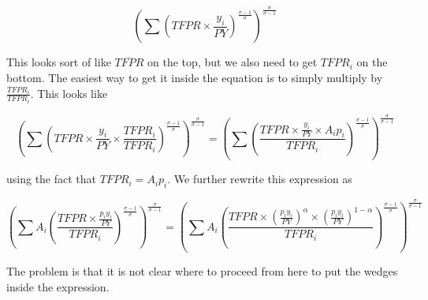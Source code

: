 \documentclass[12pt, letterpaper]{article}
\begin{document}
    \[ \left( \sum \left(TFPR \times \frac{y_i}{P Y}\right)^{\frac{\sigma - 1}{\sigma}} \right)^{\frac{\sigma}{\sigma - 1}}   \]

    This looks sort of like \(\overline{TFPR}\) on the top, but we also need to get \(TFPR_i\) on the bottom. The easiest way to get it inside the equation is to simply multiply by \(\frac{TFPR_i}{TFPR_i}\). This looks like

    \[ \left( \sum \left(TFPR \times \frac{y_i}{P Y} \times \frac{TFPR_i}{TFPR_i}\right)^{\frac{\sigma - 1}{\sigma}} \right)^{\frac{\sigma}{\sigma - 1}} = \left( \sum \left( \frac{TFPR \times \frac{y_i}{P Y} \times A_i p_i}{TFPR_i}\right)^{\frac{\sigma - 1}{\sigma}} \right)^{\frac{\sigma}{\sigma - 1}}    \]

    using the fact that \(TFPR_i = A_i p_i\). We further rewrite this expression as

    \[ \left( \sum A_i \left( \frac{TFPR \times \frac{p_i y_i}{P Y}}{TFPR_i}\right)^{\frac{\sigma - 1}{\sigma}} \right)^{\frac{\sigma}{\sigma - 1}} = \left( \sum A_i \left( \frac{TFPR \times \left(\frac{p_i y_i}{P Y}\right)^\alpha \times \left(\frac{p_i y_i}{P Y}\right)^{1 - \alpha}}{TFPR_i}\right)^{\frac{\sigma - 1}{\sigma}} \right)^{\frac{\sigma}{\sigma - 1}}   \]

    The problem is that it is not clear where to proceed from here to put the wedges inside the expression.




\end{document}

